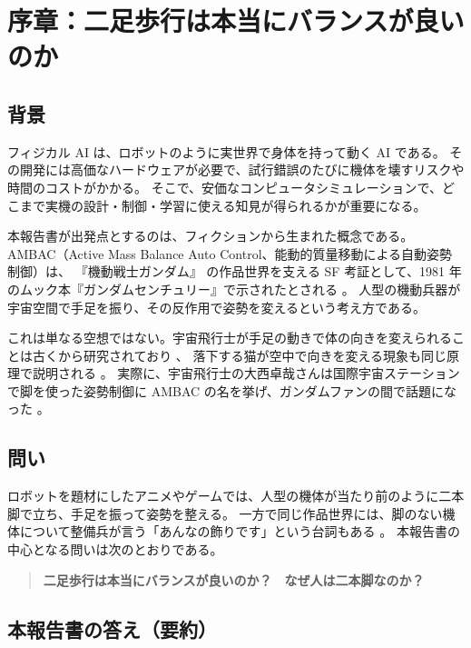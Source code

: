 \chapter{序章：二足歩行は本当にバランスが良いのか}\label{ch:intro}

\section{背景}

フィジカル AI は、ロボットのように実世界で身体を持って動く AI である。
その開発には高価なハードウェアが必要で、試行錯誤のたびに機体を壊すリスクや時間のコストがかかる。
そこで、安価なコンピュータシミュレーションで、どこまで実機の設計・制御・学習に使える知見が得られるかが重要になる。

本報告書が出発点とするのは、フィクションから生まれた概念である。
AMBAC（Active Mass Balance Auto Control、能動的質量移動による自動姿勢制御）は、
『機動戦士ガンダム』\cite{R1} の作品世界を支える SF 考証として、1981 年のムック本『ガンダムセンチュリー』で示されたとされる \cite{R42}。
人型の機動兵器が宇宙空間で手足を振り、その反作用で姿勢を変えるという考え方である。

これは単なる空想ではない。宇宙飛行士が手足の動きで体の向きを変えられることは古くから研究されており \cite{R8}、
落下する猫が空中で向きを変える現象も同じ原理で説明される \cite{R4,R7}。
実際に、宇宙飛行士の大西卓哉さんは国際宇宙ステーションで脚を使った姿勢制御に AMBAC の名を挙げ、ガンダムファンの間で話題になった \cite{R43,R44}。

\section{問い}

ロボットを題材にしたアニメやゲームでは、人型の機体が当たり前のように二本脚で立ち、手足を振って姿勢を整える。
一方で同じ作品世界には、脚のない機体について整備兵が言う「あんなの飾りです」という台詞もある \cite{R2}。
本報告書の中心となる問いは次のとおりである。

\begin{quote}
\textbf{二足歩行は本当にバランスが良いのか？　なぜ人は二本脚なのか？}
\end{quote}

\section{本報告書の答え（要約）}

